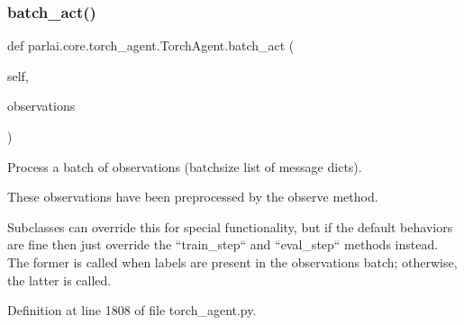 \subsubsection{\texorpdfstring{batch\+\_\+act()}{batch\_act()}}
{\footnotesize\ttfamily def parlai.\+core.\+torch\+\_\+agent.\+Torch\+Agent.\+batch\+\_\+act (\begin{DoxyParamCaption}\item[{}]{self,  }\item[{}]{observations }\end{DoxyParamCaption})}

\begin{DoxyVerb}Process a batch of observations (batchsize list of message dicts).

These observations have been preprocessed by the observe method.

Subclasses can override this for special functionality, but if the
default behaviors are fine then just override the ``train_step`` and
``eval_step`` methods instead. The former is called when labels are
present in the observations batch; otherwise, the latter is called.
\end{DoxyVerb}
 

Definition at line 1808 of file torch\+\_\+agent.\+py.


